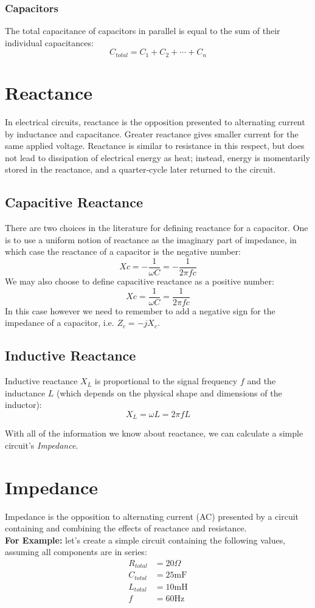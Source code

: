 \documentclass[12pt,a4paper,oneside]{article}
\begin{document}
\subsubsection{Capacitors}
The total capacitance of capacitors in parallel is equal to the sum of their individual capacitances:
\[
	C_{total} = C_1 + C_2 + \cdots + C_n
\]
\section{Reactance}
In electrical circuits, reactance is the opposition presented to alternating current by inductance and capacitance. Greater reactance gives smaller current for the same applied voltage. Reactance is similar to resistance in this respect, but does not lead to dissipation of electrical energy as heat; instead, energy is momentarily stored in the reactance, and a quarter-cycle later returned to the circuit.
\subsection{Capacitive Reactance}
There are two choices in the literature for defining reactance for a capacitor. One is to use a uniform notion of reactance as the imaginary part of impedance, in which case the reactance of a capacitor is the negative number:
\[
	Xc = -\frac{1}{\omega C} = -\frac{1}{2 \pi f c}
\]
We may also choose to define capacitive reactance as a positive number:
\[
	Xc = \frac{1}{\omega C} = \frac{1}{2 \pi f c}
\]
In this case however we need to remember to add a negative sign for the impedance of a capacitor, i.e. \(Z_c = -jX_c\).
\subsection{Inductive Reactance}
Inductive reactance \(X_{L}\) is proportional to the signal frequency \(f\) and the inductance \(L\) (which depends on the physical shape and dimensions of the inductor):
\[
	X_L = \omega L = 2 \pi f L
\]

With all of the information we know about reactance, we can calculate a simple circuit's \textit{Impedance}.
\section{Impedance}
Impedance is the opposition to alternating current (AC) presented by a circuit containing and combining the effects of reactance and resistance. \\
\textbf{For Example:} let's create a simple circuit containing the following values, assuming all components are in series:
\begin{align*}
	R_{total} &= 20\Omega \\
	C_{total} &= 25\text{mF} \\
	L_{total} &= 10\text{mH} \\
	f &= 60\text{Hz}
\end{align*}
\end{document}
